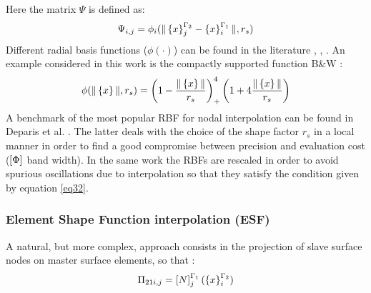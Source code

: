      Here the matrix $\Psi$ is defined as:
     \begin{equation}
     \label{eq.40}
       \Psi_ {i,j}=\phi_i(\|\left\lbrace{x}\right \rbrace^{\Gamma_2}_j-\left\lbrace{x}\right \rbrace^{\Gamma_1}_i\|,r_s)
     \end{equation}
     Different radial basis functions ($\phi(\cdot)$) can be found in the literature  \cite{wendland1995piecewise},\cite{buhmann2003radial} , \cite{duchon1977splines}.  An example considered in this work is the compactly supported function B\&W \cite{wendland1995piecewise}:
     \begin{equation}
     \label{eq.41}
     \phi(\|\left\lbrace{x}\right \rbrace\|,r_s)=\left(1-\frac{\|\left\lbrace{x}\right \rbrace\|}{r_s}\right)^4_+\left(1+4\frac{\|\left\lbrace{x}\right \rbrace\|}{r_s}\right)
     \end{equation}
     A benchmark of the most popular RBF for nodal interpolation can be found in Deparis et al. \cite{deparis2014rescaled}. The latter deals with the choice of the shape factor $r_s$ in a local manner in order to find a good compromise between precision and evaluation cost ($\left[{\Phi}\right]$ band width). In the same work the RBFs are rescaled in order to avoid spurious oscillations due to interpolation so that they satisfy the condition given by equation \eqref{eq32}. 
     \subsubsection{Element Shape Function interpolation (ESF)}\label{sssec333}
     A natural, but more complex, approach consists in the projection of slave surface nodes on master surface  elements, so that :
     \begin{equation}
     \label{eq.42}
         \Pi_{21i,j}=\left[{N}\right]_{j}^{\Gamma_1}(\left\lbrace{x}\right \rbrace_i^{\Gamma_2})
     \end{equation}
     
